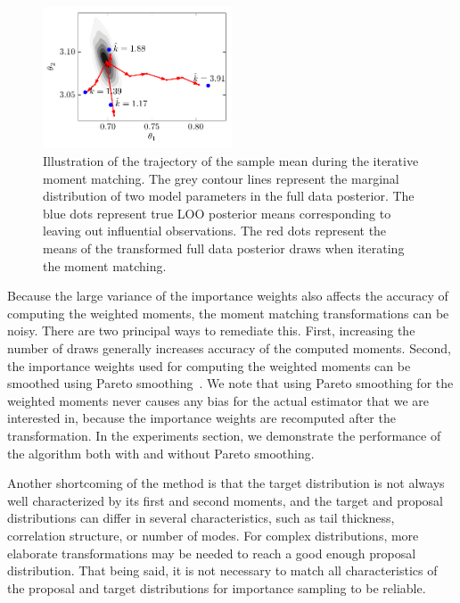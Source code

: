 \documentclass[12pt]{article}
\begin{document}
\begin{figure}[h]
\centering
\includegraphics[width = 0.5\textwidth]{figs/illustr_roach2.pdf}
%
\caption{Illustration of the trajectory of the sample mean during the iterative moment matching.
The grey contour lines represent the marginal distribution of
two model parameters in the full data posterior. The blue dots represent
true LOO posterior means corresponding to leaving out influential observations. The red dots represent the means
of the transformed full data posterior draws when iterating the moment matching.} \label{fig:illustr}
\end{figure}






Because the large variance of the importance weights also affects the accuracy
of computing the weighted moments, the moment matching transformations can be noisy.
There are two principal ways to remediate this.
First, increasing the number of draws generally increases accuracy
of the computed moments.
Second, the importance weights used for computing the weighted moments
can be smoothed using Pareto smoothing~\citep{vehtari2017practical}.
We note that using Pareto smoothing for the weighted moments never causes
any bias for the actual estimator that we are interested in, because the importance weights are recomputed after the transformation.
In the experiments section, we demonstrate the performance of the algorithm both with and without Pareto smoothing.



Another shortcoming of the method is that the target distribution is not always well characterized by its first and second moments, and
the target and proposal distributions can differ in several
characteristics, such as tail thickness, correlation structure, or
number of modes.
For complex distributions, more
elaborate transformations may be needed
to reach a good enough proposal distribution.
That being said, it is not necessary to match all characteristics of the
proposal and target distributions for importance sampling to be reliable.
\end{document}

